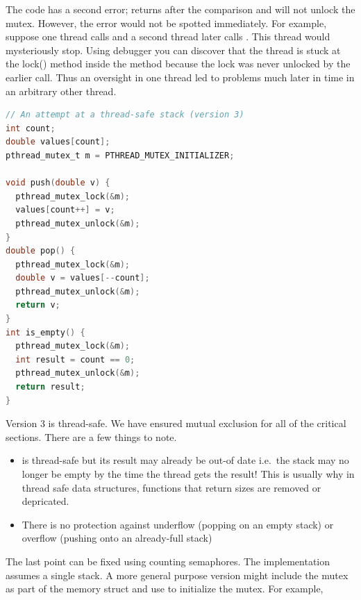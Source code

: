 The code has a second error;  returns after the comparison and will not unlock the mutex.
However, the error would not be spotted immediately.
For example, suppose one thread calls  and a second thread later calls .
This thread would mysteriously stop.
Using debugger you can discover that the thread is stuck at the lock() method inside the  method because the lock was never unlocked by the earlier  call.
Thus an oversight in one thread led to problems much later in time in an arbitrary other thread.

\begin{lstlisting}[language=C]
// An attempt at a thread-safe stack (version 3)
int count;
double values[count];
pthread_mutex_t m = PTHREAD_MUTEX_INITIALIZER;

void push(double v) { 
  pthread_mutex_lock(&m); 
  values[count++] = v;
  pthread_mutex_unlock(&m);
}
double pop() {
  pthread_mutex_lock(&m);
  double v = values[--count];
  pthread_mutex_unlock(&m);
  return v;
}
int is_empty() {
  pthread_mutex_lock(&m);
  int result = count == 0;
  pthread_mutex_unlock(&m);
  return result;
}
\end{lstlisting}

Version 3 is thread-safe.
We have ensured mutual exclusion for all of the critical sections.
There are a few things to note.

\begin{itemize}
\item {} is thread-safe but its result may already be out-of date i.e.~the stack may no longer be empty by the time the thread gets the result!
  This is usually why in thread safe data structures, functions that return sizes are removed or depricated.
  \item There is no protection against underflow (popping on an empty stack) or overflow (pushing onto an already-full stack)
\end{itemize}

The last point can be fixed using counting semaphores. The implementation assumes a single stack. A more general purpose version might include the mutex as part of the memory struct and use  to initialize the mutex. For example,

